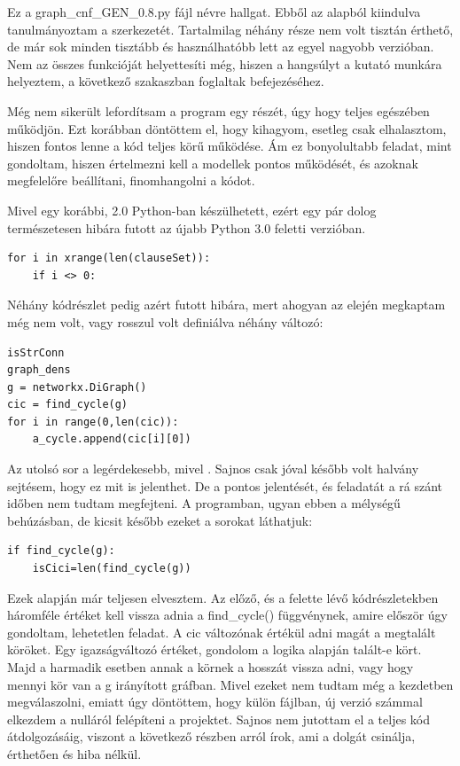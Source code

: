 \documentclass[
]{thesis-ekf}
\theoremstyle{definition}
\theoremstyle{remark}
\begin{document}
	Ez a graph\_cnf\_GEN\_0.8.py \cite{github-py08} fájl névre hallgat. Ebből az alapból kiindulva tanulmányoztam a szerkezetét. Tartalmilag néhány része nem volt tisztán érthető, de már sok minden tisztább és használhatóbb lett az egyel nagyobb verzióban. Nem az összes funkcióját helyettesíti még, hiszen a hangsúlyt a kutató munkára helyeztem, a következő szakaszban foglaltak befejezéséhez.
	
	Még nem sikerült lefordítsam a program egy részét, úgy hogy teljes egészében működjön. Ezt korábban döntöttem el, hogy kihagyom, esetleg csak elhalasztom, hiszen fontos lenne a kód teljes körű működése. Ám ez bonyolultabb feladat, mint gondoltam, hiszen értelmezni kell a modellek pontos működését, és azoknak megfelelőre beállítani, finomhangolni a kódot. 
	
	Mivel  egy korábbi, 2.0 Python-ban készülhetett, ezért egy pár dolog természetesen hibára futott az újabb Python 3.0 feletti verzióban. 
	
	\begin{lstlisting}
for i in xrange(len(clauseSet)):
	if i <> 0:
	\end{lstlisting}

	Néhány kódrészlet pedig azért futott hibára, mert ahogyan az elején megkaptam még nem volt, vagy rosszul volt definiálva néhány változó:
	
	\begin{lstlisting}
isStrConn
graph_dens
g = networkx.DiGraph()
cic = find_cycle(g)
for i in range(0,len(cic)):
	a_cycle.append(cic[i][0])
	\end{lstlisting}

	Az utolsó sor a legérdekesebb, mivel . Sajnos csak jóval később volt halvány sejtésem, hogy ez mit is jelenthet. De a pontos jelentését, és feladatát a rá szánt időben nem tudtam megfejteni. A programban, ugyan ebben a mélységű behúzásban, de kicsit később ezeket a sorokat láthatjuk:
	
	\begin{lstlisting}
if find_cycle(g):
	isCici=len(find_cycle(g))
	\end{lstlisting}

	Ezek alapján már teljesen elvesztem. Az előző, és a felette lévő kódrészletekben háromféle értéket kell vissza adnia a find\_cycle() függvénynek, amire először úgy gondoltam, lehetetlen feladat. A cic változónak értékül adni magát a megtalált köröket. Egy igazságváltozó értéket, gondolom a logika alapján talált-e kört. Majd a harmadik esetben annak a körnek a hosszát vissza adni, vagy hogy mennyi kör van a g irányított gráfban. Mivel ezeket nem tudtam még a kezdetben megválaszolni, emiatt úgy döntöttem, hogy külön fájlban, új verzió számmal elkezdem a nulláról felépíteni a projektet. Sajnos nem jutottam el a teljes kód átdolgozásáig, viszont a következő részben arról írok, ami a dolgát csinálja, érthetően és hiba nélkül.
	
\end{document}
